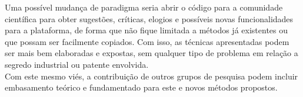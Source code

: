 \begin{enumerate}
\begin{enumerate}[label*=\arabic*.]
Uma possível mudança de paradigma seria abrir o código para a comunidade científica para obter sugestões, críticas, elogios e possíveis novas funcionalidades para a plataforma, de forma que não fique limitada a métodos já existentes ou que possam ser facilmente copiados. Com isso, as técnicas apresentadas podem ser mais bem elaboradas e expostas, sem qualquer tipo de problema em relação a segredo industrial ou patente envolvida.
\\[6pt]
Com este mesmo viés, a contribuição de outros grupos de pesquisa podem incluir embasamento teórico e fundamentado para este e novos métodos propostos.
    \end{enumerate}
\end{enumerate}
